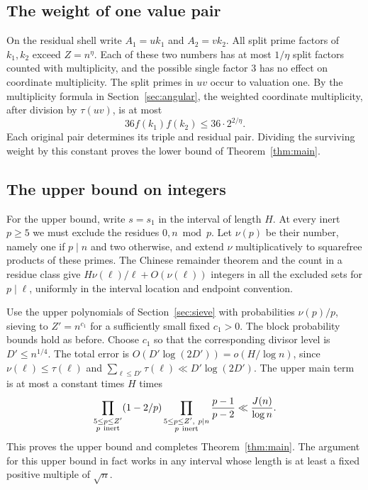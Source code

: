 \subsection{The weight of one value pair}
On the residual shell write \(A_1=uk_1\) and \(A_2=vk_2\).
All split prime factors of \(k_1,k_2\) exceed \(Z=n^\eta\).
Each of these two numbers has at most \(1/\eta\) split factors
counted with multiplicity, and the possible single factor \(3\)
has no effect on coordinate multiplicity.
The split primes in \(uv\) occur to valuation one. By the
multiplicity formula in Section~\ref{sec:angular}, the weighted
coordinate multiplicity, after division by \(\tau(uv)\),
is at most
\[
 36f(k_1)f(k_2)\le36\cdot 2^{2/\eta}.
\]
Each original pair determines its triple and residual pair.
Dividing the surviving weight by this constant proves the lower
bound of Theorem~\ref{thm:main}.

\subsection{The upper bound on integers}
For the upper bound, write \(s=s_1\) in the interval of length
\(H\). At every inert \(p\ge5\) we must exclude the residues
\(0,n\bmod p\). Let \(\nu(p)\) be their number, namely one if
\(p\mid n\) and two otherwise, and extend \(\nu\)
multiplicatively to squarefree products of these primes.
The Chinese remainder theorem and the count in a residue
class give \(H\nu(\ell)/\ell+O(\nu(\ell))\) integers in
all the excluded sets for \(p\mid\ell\), uniformly in the
interval location and endpoint convention.

Use the upper polynomials of Section~\ref{sec:sieve} with
probabilities \(\nu(p)/p\), sieving to \(Z'=n^{c_1}\) for a
sufficiently small fixed \(c_1>0\).
The block probability bounds hold as before. Choose \(c_1\)
so that the corresponding divisor level is \(D'\le n^{1/4}\).
The total error is \(O(D'\log(2D'))=o(H/\log n)\), since
\(\nu(\ell)\le\tau(\ell)\)
and \(\sum_{\ell\le D'}\tau(\ell)\ll D'\log(2D')\).
The upper main term is at most a constant times \(H\) times
\[
 \prod_{\substack{5\le p\le Z'\\ p\ {\rm inert}}}(1-2/p)
 \prod_{\substack{5\le p\le Z',\ p\mid n\\ p\ {\rm inert}}}
                        \frac{p-1}{p-2}
 \ll \frac{J(n)}{\log n}.
\]
This proves the upper bound and completes Theorem~\ref{thm:main}.
The argument for this upper bound in fact works in any interval
whose length is at least a fixed positive multiple of \(\sqrt n\).

